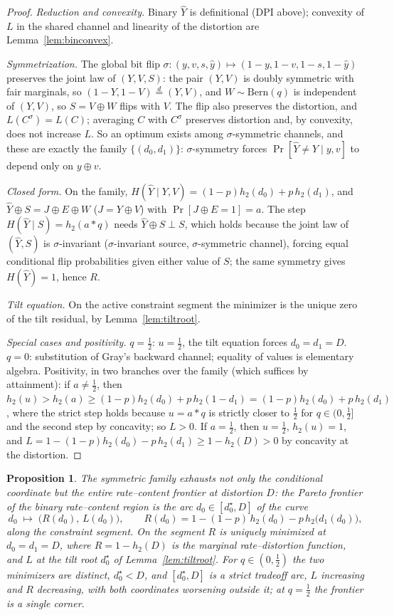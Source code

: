 \documentclass[11pt,onecolumn]{IEEEtran}
\newtheorem{proposition}[theorem]{Proposition}
\newcommand{\hY}{\widehat{Y}}
\begin{document}
\begin{proof}
\emph{Reduction and convexity.} Binary $\hY$ is definitional (DPI
above); convexity of $L$ in the shared channel and linearity of the
distortion are Lemma~\ref{lem:binconvex}.

\emph{Symmetrization.} The global bit flip
$\sigma:(y,v,s,\hat y)\mapsto(1{-}y,1{-}v,1{-}s,1{-}\hat y)$ preserves
the joint law of $(Y,V,S)$: the pair $(Y,V)$ is doubly symmetric with
fair marginals, so $(1{-}Y,1{-}V)\overset{d}=(Y,V)$, and $W\sim
\mathrm{Bern}(q)$ is independent of $(Y,V)$, so $S=V\oplus W$ flips
with $V$. The flip also preserves the distortion, and
$L(C^\sigma)=L(C)$;
averaging $C$ with $C^\sigma$ preserves distortion and, by convexity,
does not increase $L$. So an optimum exists among $\sigma$-symmetric
channels, and these are exactly the family $\{(d_0,d_1)\}$:
$\sigma$-symmetry forces $\Pr[\hY\ne Y\mid y,v]$ to depend only on
$y\oplus v$.

\emph{Closed form.} On the family, $H(\hY\mid Y,V)=
(1-p)h_2(d_0)+p\,h_2(d_1)$, and $\hY\oplus S=J\oplus E\oplus W$
($J=Y\oplus V$) with $\Pr[J\oplus E=1]=a$. The step
$H(\hY\mid S)=h_2(a*q)$ needs $\hY\oplus S\perp S$, which holds
because the joint law of $(\hY,S)$ is $\sigma$-invariant
($\sigma$-invariant source, $\sigma$-symmetric channel), forcing equal
conditional flip probabilities given either value of $S$; the same
symmetry gives $H(\hY)=1$, hence $R$.

\emph{Tilt equation.} On the active constraint segment the minimizer is
the unique zero of the tilt residual, by Lemma~\ref{lem:tiltroot}.

\emph{Special cases and positivity.} $q=\tfrac12$: $u=\tfrac12$, the tilt
equation forces $d_0=d_1=D$. $q=0$: substitution of Gray's backward
channel; equality of values is elementary algebra. Positivity, in two
branches over the family (which suffices by attainment): if
$a\ne\tfrac12$, then $h_2(u)>h_2(a)\ge(1-p)h_2(d_0)+p\,h_2(1-d_1)
=(1-p)h_2(d_0)+p\,h_2(d_1)$, where the strict step holds because $u=a*q$
is strictly closer to $\tfrac12$ for $q\in(0,\tfrac12]$ and the second
step by concavity; so $L>0$. If $a=\tfrac12$, then $u=\tfrac12$,
$h_2(u)=1$, and $L=1-(1-p)h_2(d_0)-p\,h_2(d_1)\ge1-h_2(D)>0$ by
concavity at the distortion.
\end{proof}

\begin{proposition}\label{rem:binfrontier}
The symmetric family exhausts not only the conditional coordinate but
the entire rate--content frontier at distortion $D$: the Pareto
frontier of the binary rate--content region is the arc $d_0\in[d_0^\star,D]$
of the curve
\[
d_0\;\longmapsto\;\bigl(R(d_0),\,L(d_0)\bigr),
\qquad
R(d_0)=1-(1-p)\,h_2(d_0)-p\,h_2\bigl(d_1(d_0)\bigr),
\]
along the constraint segment. On the segment $R$ is uniquely minimized
at $d_0=d_1=D$, where $R=1-h_2(D)$ is the marginal rate--distortion
function, and $L$ at the tilt root $d_0^\star$ of
Lemma~\ref{lem:tiltroot}. For $q\in(0,\tfrac12)$ the two minimizers are
distinct, $d_0^\star<D$, and $[d_0^\star,D]$ is a strict tradeoff arc,
$L$ increasing and $R$ decreasing, with both coordinates worsening
outside it; at $q=\tfrac12$ the frontier is a single corner.
\end{proposition}
\end{document}
